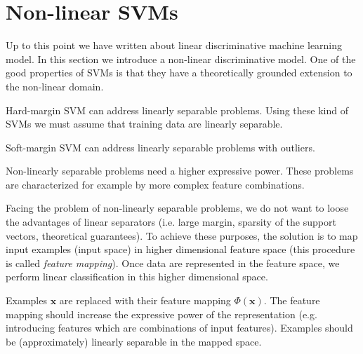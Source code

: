 \chapter{Non-linear SVMs}
\label{cha:non_linear_SVM} Up to this point we have written about linear discriminative
machine learning model. In this section we introduce a non-linear discriminative
model. One of the good properties of SVMs is that they have a theoretically grounded
extension to the non-linear domain.
\newline

Hard-margin SVM can address linearly separable problems. Using these kind of
SVMs we must assume that training data are linearly separable.
\newline

Soft-margin SVM can address linearly separable problems with outliers.
\newline

Non-linearly separable problems need a higher expressive power. These problems are
characterized for example by more complex feature combinations.
\newline

Facing the problem of non-linearly separable problems, we do not want to loose
the advantages of linear separators (i.e. large margin, sparsity of the support vectors,
theoretical guarantees). To achieve these purposes, the solution is to map input
examples (input space) in higher dimensional feature space (this procedure is
called \textit{feature mapping}). Once data are represented in the feature space,
we perform linear classification in this higher dimensional space.


Examples $\pmb{x}$ are replaced with their feature mapping $\Phi(\pmb{x})$. The feature
mapping should increase the expressive power of the representation (e.g. introducing
features which are combinations of input features). Examples should be (approximately)
linearly separable in the mapped space.

